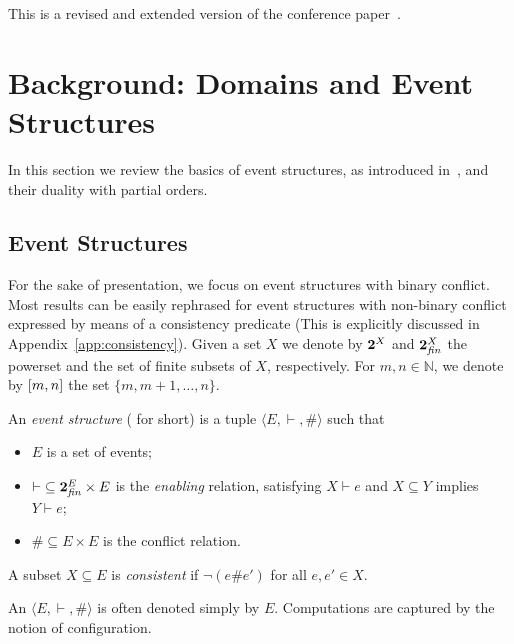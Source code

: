 This is a revised and extended  version of the conference paper~\cite{BCG:DESF}.


\section{Background: Domains and Event Structures}
\label{se:background}

In this section we review the basics of event structures, as introduced
in~\cite{Win:ES}, and their duality with partial orders.

\subsection{Event Structures}
\label{ss:es}

For the sake of presentation, 
we focus on event structures with binary conflict.
%
Most results can be easily rephrased for event structures with
non-binary conflict expressed by means of a consistency predicate
(This is explicitly discussed in Appendix~\ref{app:consistency}).
%
Given a set $X$ we denote by
$\Pow{X}$ and $\Powfin{X}$ the powerset and the set of finite subsets
of $X$, respectively. For $m,n \in \mathbb{N}$, we denote by
$\interval[m]{n}$ the set $\{ m, m+1, \ldots, n\}$.

\begin{definition}
  \label{de:es}
  An \emph{event structure} ({\esabbr} for short) is a tuple
  $\langle E, \vdash, \# \rangle$ such that
  \begin{itemize}
  \item $E$ is a set of events;
  \item ${\vdash} \subseteq \Powfin{E} \times E$ is the \emph{enabling}
    relation, satisfying $X \vdash e$ and $X \subseteq Y$
    implies $Y \vdash e$;
  \item $\# \subseteq E \times E$ is the conflict relation.
  \end{itemize}
  A subset $X \subseteq E$ is \emph{consistent} if $\neg (e \# e')$
  for all $e, e' \in X$.
\end{definition}


An {\esabbr} $\langle E, \vdash, \# \rangle$ is often
denoted simply by $E$.  Computations are captured by the notion of
configuration.

